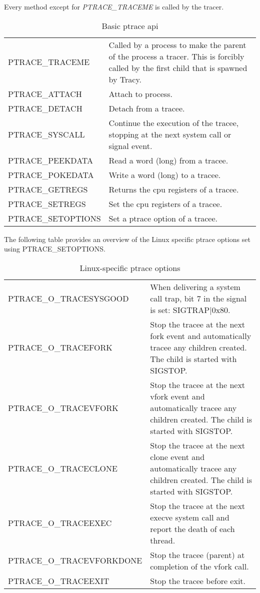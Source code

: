 \documentclass[a4paper, 10pt]{report}
\begin{document}
Every method except for \textit{PTRACE\_TRACEME} is called by the tracer.
\begin{table}[h!]
    \centering
    \begin{tabular}{|l|p{8cm}|}
    \hline
        PTRACE\_TRACEME & Called by a process to make the parent of the process
        a tracer. This is forcibly called by the first child that is
        spawned by Tracy. \\
        PTRACE\_ATTACH & Attach to process. \\
        PTRACE\_DETACH & Detach from a tracee. \\
        PTRACE\_SYSCALL & Continue the execution of the tracee,
        stopping at the next system call or signal event. \\
        PTRACE\_PEEKDATA & Read a word (long) from a tracee. \\
        PTRACE\_POKEDATA & Write a word (long) to a tracee. \\
        PTRACE\_GETREGS & Returns the cpu registers of a tracee. \\
        PTRACE\_SETREGS & Set the cpu registers of a tracee. \\
        PTRACE\_SETOPTIONS & Set a ptrace option of a tracee. \\
    \hline
    \end{tabular}
    \caption{Basic ptrace api}
    \label{tab:ptrace-api}
\end{table}

\newpage

The following table provides an overview of the Linux specific ptrace
options set using PTRACE\_SETOPTIONS.

\begin{table}[h!]
    \centering
    \begin{tabular}{|l|p{8cm}|}
    \hline
        PTRACE\_O\_TRACESYSGOOD & When delivering a system call trap, bit 7 in
    the signal is set: SIGTRAP$|$0x80.\\
        PTRACE\_O\_TRACEFORK & Stop the tracee at the next fork event and
    automatically tracee any children created. The child is started with
    SIGSTOP. \\
        PTRACE\_O\_TRACEVFORK & Stop the tracee at the next vfork event and
    automatically tracee any children created. The child is started with
    SIGSTOP. \\
        PTRACE\_O\_TRACECLONE & Stop the tracee at the next clone event and
    automatically tracee any children created. The child is started with
    SIGSTOP. \\
        PTRACE\_O\_TRACEEXEC & Stop the tracee at the next execve system call
    and report the death of each thread. \\
        PTRACE\_O\_TRACEVFORKDONE & Stop the tracee (parent) at completion
    of the vfork call. \\
        PTRACE\_O\_TRACEEXIT & Stop the tracee before exit. \\
    \hline
    \end{tabular}
    \caption{Linux-specific ptrace options}
    \label{tab:ptrace-opt}
\end{table}


% 
\end{document}
